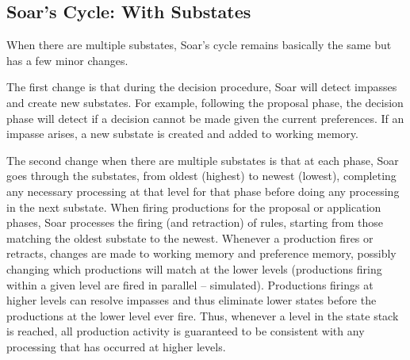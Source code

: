 \subsection{Soar's Cycle: With Substates}
\label{ARCH-decision-substates}

When there are multiple substates, Soar's cycle remains basically the
same but has a few minor changes.  


The first change is that during the decision procedure, Soar will detect
impasses and create new substates.  For example, following the proposal
phase, the decision phase will detect if a decision cannot be made given
the current preferences.  If an impasse arises, a new substate is
created and added to working memory.  


The second change when there are multiple substates is that at each
phase, Soar goes through the substates, from oldest (highest) to newest
(lowest), completing any necessary processing at that level for that
phase before doing any processing in the next substate.  When firing
productions for the proposal or application phases, Soar processes the
firing (and retraction) of rules, starting from those matching the
oldest substate to the newest.  Whenever a production fires or retracts,
changes are made to working memory and preference memory, possibly
changing which productions will match at the lower levels (productions
firing within a given level are fired in parallel -- simulated).
Productions firings at higher levels can resolve impasses and thus
eliminate lower states before the productions at the lower level ever
fire.  Thus, whenever a level in the state stack is reached, all
production activity is guaranteed to be consistent with any processing
that has occurred at higher levels.


